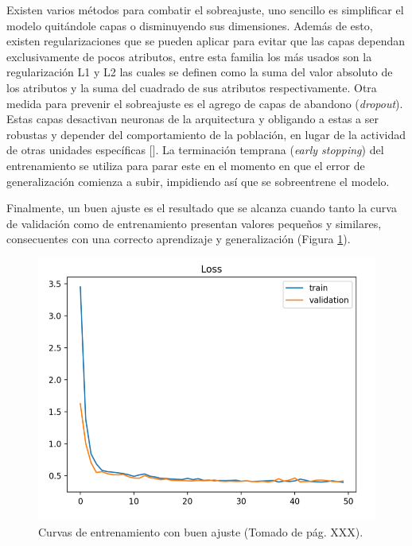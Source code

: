 Existen varios métodos para combatir el sobreajuste, uno sencillo es simplificar el modelo quitándole capas 
o disminuyendo sus dimensiones. Además de esto, existen regularizaciones que se pueden aplicar para evitar que 
las capas dependan exclusivamente de pocos atributos, entre esta familia los más usados son la regularización
L1 y L2 las cuales se definen como la suma del valor absoluto de los atributos y la suma del cuadrado de sus 
atributos respectivamente. Otra medida para prevenir el sobreajuste es el agrego de capas de abandono 
(\emph{dropout}). Estas capas desactivan neuronas de la arquitectura y obligando a 
estas a ser robustas y depender del comportamiento de la población, en lugar de la actividad de otras unidades 
específicas [\cite{baldi2013dropout}]. La terminación temprana (\emph{early stopping}) del entrenamiento
se utiliza para parar este en el momento en que el error de generalización comienza a subir, impidiendo así que 
se sobreentrene el modelo.

Finalmente, un buen ajuste es el resultado que se alcanza cuando tanto la curva de validación como de entrenamiento
presentan valores pequeños y similares, consecuentes con una correcto aprendizaje y generalización (Figura \ref{fig:good_fit}).

\begin{figure}[h!]
	\begin{center}
		\begin{center}
			\includegraphics[scale=.3]{Graphics/good_fit.png}
        \end{center}
	    \caption{Curvas de entrenamiento con buen ajuste (Tomado de \textcite{brownlee2018better} pág. XXX).}\label{fig:good_fit}
	\end{center}
\end{figure}

